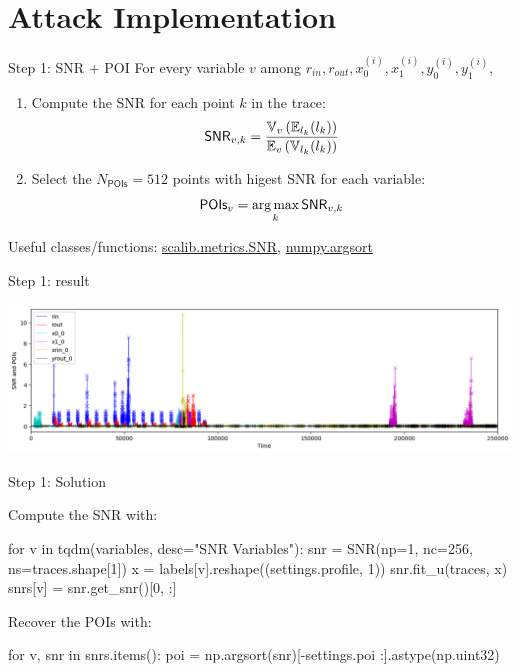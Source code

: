 \documentclass[aspectratio=169]{beamer}
\begin{document}
\section{Attack Implementation}
\begin{frame}{Step 1: SNR + POI}
    For every variable $v$ among $r_{in}, r_{out}, x^{(i)}_0, x^{(i)}_1, y^{(i)}_0, y^{(i)}_1$,
    \begin{enumerate}
        \item Compute the SNR for each point $k$ in the trace:
            \[
                \textsf{SNR}_{v,k} = \frac{
                    \operatorname*{\mathbb{V}}_{v}\left(\operatorname*{\mathbb{E}}_{l_k}(l_k)\right)
                }{
                    \operatorname*{\mathbb{E}}_{v}\left(\operatorname*{\mathbb{V}}_{l_k}(l_k)\right)
                }
            \]
        \item Select the $N_{\textsf{POIs}}=512$ points with higest SNR for each variable:
            \[
                \textsf{POIs}_{v} = \operatorname*{\arg\max}_k \textsf{SNR}_{v,k}
            \]
    \end{enumerate}

    Useful classes/functions:
    \href{https://scalib.readthedocs.io/en/stable/source/api/scalib.metrics.SNR.html}{scalib.metrics.SNR},
    \href{https://numpy.org/doc/stable/reference/generated/numpy.argsort.html}{numpy.argsort}
\end{frame}
\begin{frame}{Step 1: result}
    \begin{center}
        \includegraphics[width=\textwidth]{figures/res_step1.png}
    \end{center}
\end{frame}

\begin{frame}[containsverbatim]{Step 1: Solution}

Compute the SNR with:
\begin{python}
for v in tqdm(variables, desc="SNR Variables"):
    snr = SNR(np=1, nc=256, ns=traces.shape[1])
    x = labels[v].reshape((settings.profile, 1))
    snr.fit_u(traces, x)
    snrs[v] = snr.get_snr()[0, :]
\end{python}
Recover the POIs with:
\begin{python}
for v, snr in snrs.items():
    poi = np.argsort(snr)[-settings.poi :].astype(np.uint32)
\end{python}
\end{frame}
\end{document}
